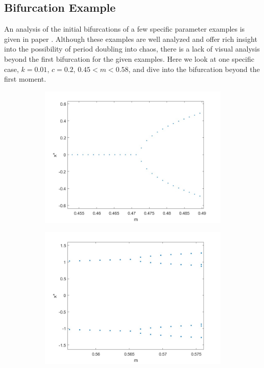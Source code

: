 \documentclass[12pt, letterpaper]{article}
\begin{document}
\subsection{Bifurcation Example}
An analysis of the initial bifurcations of a few specific parameter examples is given in paper \cite{kim1998hu}. Although these examples are well analyzed and offer rich insight into the possibility of period doubling into chaos, there is a lack of visual analysis beyond the first bifurcation for the given examples. Here we look at one specific case, $k=0.01$, $c=0.2$, $0.45<m<0.58$, and dive into the bifurcation beyond the first moment. 
\begin{figure}[h]
    \centering
    \begin{subfigure}[b]{0.45\textwidth}
        \centering
        \includegraphics[width=\linewidth]{Bif_diag_poincare_2_P2.jpg}
    \end{subfigure}
    \hfill
    \begin{subfigure}[b]{0.45\textwidth}
        \centering
        \includegraphics[width=\linewidth]{Bif_diag_poincare_2_P3.jpg}

\end{subfigure}
\end{figure}
\end{document}
